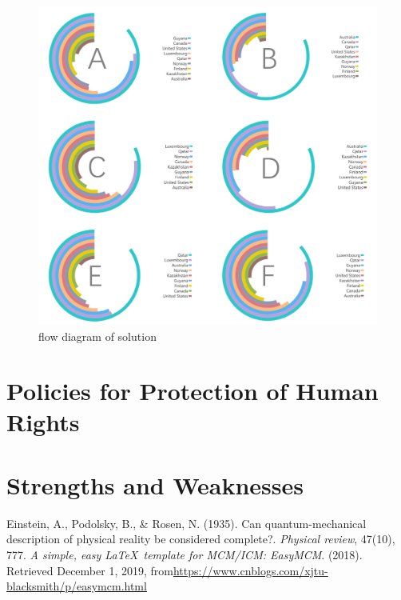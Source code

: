 \documentclass[12pt]{article}  %
\begin{document}
\begin{figure}[htbp]
	\centering
	\includegraphics[width=.8\textwidth]{ABCDEF.png}
	\caption{ flow diagram of solution}\label{ABCDEF}
\end{figure}


\newpage

\section{Policies for Protection of Human Rights}





\section{Strengths and Weaknesses}






\begin{thebibliography}{99}
 Einstein, A., Podolsky, B., \& Rosen, N. (1935). Can quantum-mechanical description of physical reality be considered complete?. \emph{Physical review}, 47(10), 777.
 \emph{A simple, easy \LaTeX\ template for MCM/ICM: EasyMCM}. (2018). Retrieved December 1, 2019, from\url{https://www.cnblogs.com/xjtu-blacksmith/p/easymcm.html}
\end{thebibliography}
\end{document}
